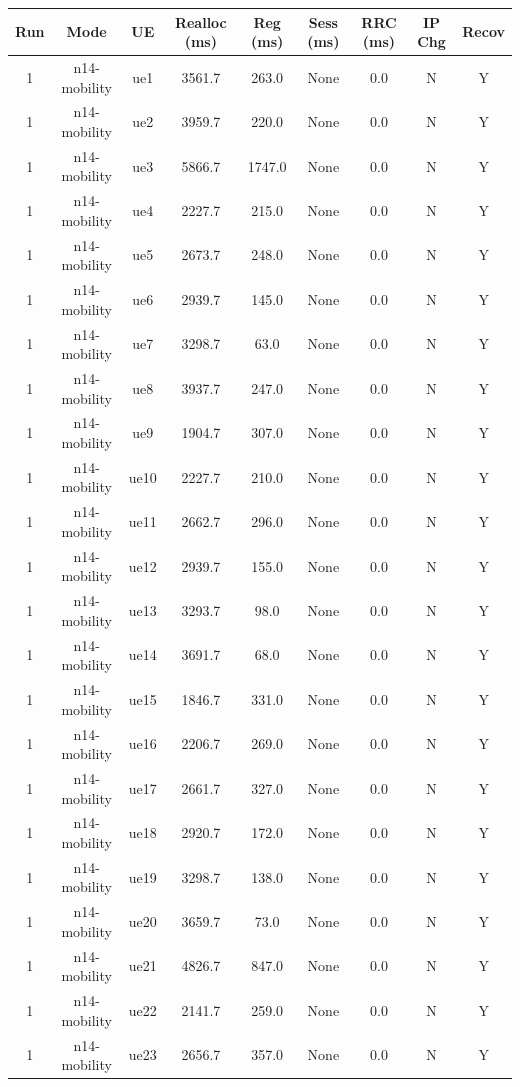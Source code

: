 \begin{table}[ht]
\centering
\begin{tabular}{|c|c|c|c|c|c|c|c|c|}
\hline
Run & Mode & UE & Realloc (ms) & Reg (ms) & Sess (ms) & RRC (ms) & IP Chg & Recov \\
\hline
1 & n14-mobility & ue1 & 3561.7 & 263.0 & None & 0.0 & N & Y \\
1 & n14-mobility & ue2 & 3959.7 & 220.0 & None & 0.0 & N & Y \\
1 & n14-mobility & ue3 & 5866.7 & 1747.0 & None & 0.0 & N & Y \\
1 & n14-mobility & ue4 & 2227.7 & 215.0 & None & 0.0 & N & Y \\
1 & n14-mobility & ue5 & 2673.7 & 248.0 & None & 0.0 & N & Y \\
1 & n14-mobility & ue6 & 2939.7 & 145.0 & None & 0.0 & N & Y \\
1 & n14-mobility & ue7 & 3298.7 & 63.0 & None & 0.0 & N & Y \\
1 & n14-mobility & ue8 & 3937.7 & 247.0 & None & 0.0 & N & Y \\
1 & n14-mobility & ue9 & 1904.7 & 307.0 & None & 0.0 & N & Y \\
1 & n14-mobility & ue10 & 2227.7 & 210.0 & None & 0.0 & N & Y \\
1 & n14-mobility & ue11 & 2662.7 & 296.0 & None & 0.0 & N & Y \\
1 & n14-mobility & ue12 & 2939.7 & 155.0 & None & 0.0 & N & Y \\
1 & n14-mobility & ue13 & 3293.7 & 98.0 & None & 0.0 & N & Y \\
1 & n14-mobility & ue14 & 3691.7 & 68.0 & None & 0.0 & N & Y \\
1 & n14-mobility & ue15 & 1846.7 & 331.0 & None & 0.0 & N & Y \\
1 & n14-mobility & ue16 & 2206.7 & 269.0 & None & 0.0 & N & Y \\
1 & n14-mobility & ue17 & 2661.7 & 327.0 & None & 0.0 & N & Y \\
1 & n14-mobility & ue18 & 2920.7 & 172.0 & None & 0.0 & N & Y \\
1 & n14-mobility & ue19 & 3298.7 & 138.0 & None & 0.0 & N & Y \\
1 & n14-mobility & ue20 & 3659.7 & 73.0 & None & 0.0 & N & Y \\
1 & n14-mobility & ue21 & 4826.7 & 847.0 & None & 0.0 & N & Y \\
1 & n14-mobility & ue22 & 2141.7 & 259.0 & None & 0.0 & N & Y \\
1 & n14-mobility & ue23 & 2656.7 & 357.0 & None & 0.0 & N & Y \\

\end{tabular}
\end{table}
